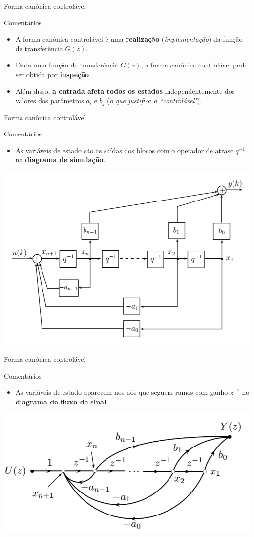 \begin{frame}{Forma canônica controlável}
\begin{block}{Comentários}
\begin{itemize}
    \item A forma canônica controlável é uma \textbf{realização} (\textit{implementação}) da função de transferência $G(z)$.
    \item Dada uma função de transferência $G(z)$, a forma canônica controlável pode ser obtida por \textbf{inspeção}.
    \item Além disso, \textbf{a entrada afeta todos os estados} independentemente dos valores dos parâmetros $a_i$ e $b_j$ (\textit{o que justifica o ``controlável"}).
\end{itemize}
\end{block}
\end{frame}

\begin{frame}{Forma canônica controlável}
\begin{block}{Comentários}
\begin{itemize}
    \item As variáveis de estado são as saídas dos blocos com o operador de atraso $q^{-1}$ no \textbf{diagrama de simulação}. 
\end{itemize}
\end{block}
\centerline{\includegraphics[width=0.73\linewidth]{Figuras/Ch14/fig4.PNG}}
\end{frame}

\begin{frame}{Forma canônica controlável}
\begin{block}{Comentários}
\begin{itemize}
    \item As variáveis de estado aparecem nos nós que seguem ramos com ganho $z^{-1}$ no \textbf{diagrama de fluxo de sinal}.
\end{itemize}
\end{block}
\centerline{\includegraphics[width=0.73\linewidth]{Figuras/Ch14/fig5.PNG}}
\end{frame}

